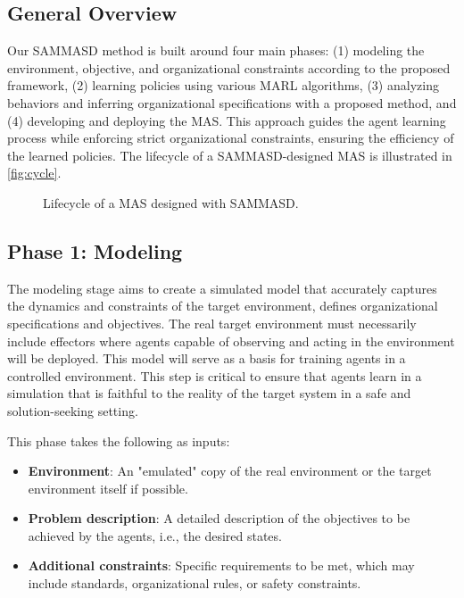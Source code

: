 \documentclass[sigconf,anonymous]{aamas}
\begin{document}
\subsection{General Overview}

Our SAMMASD method is built around four main phases: (1) modeling the environment, objective, and organizational constraints according to the proposed framework, (2) learning policies using various MARL algorithms, (3) analyzing behaviors and inferring organizational specifications with a proposed method, and (4) developing and deploying the MAS. This approach guides the agent learning process while enforcing strict organizational constraints, ensuring the efficiency of the learned policies. The lifecycle of a SAMMASD-designed MAS is illustrated in \autoref{fig:cycle}.



\begin{figure*}[h!]
  \centering
  
  \caption{Lifecycle of a MAS designed with SAMMASD.}
  \label{fig:cycle}
\end{figure*}

\subsection{Phase 1: Modeling}

The modeling stage aims to create a simulated model that accurately captures the dynamics and constraints of the target environment, defines organizational specifications and objectives. The real target environment must necessarily include effectors where agents capable of observing and acting in the environment will be deployed. This model will serve as a basis for training agents in a controlled environment. This step is critical to ensure that agents learn in a simulation that is faithful to the reality of the target system in a safe and solution-seeking setting.

This phase takes the following as inputs:
\begin{itemize}
    \item \textbf{Environment}: An "emulated" copy of the real environment or the target environment itself if possible.
    \item \textbf{Problem description}: A detailed description of the objectives to be achieved by the agents, i.e., the desired states.
    \item \textbf{Additional constraints}: Specific requirements to be met, which may include standards, organizational rules, or safety constraints.
\end{itemize}
\end{document}
